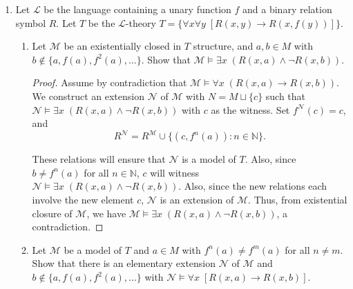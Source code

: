 \documentclass{article}
\begin{document}
\begin{enumerate}[label={\bf Q\arabic*:}]
  \item Let $\mathcal{L}$ be the language containing a unary function $f$
    and a binary relation symbol $R$. Let $T$ be the $\mathcal{L}$-theory
    $T=\{\forall x\forall y\; [R(x,y)\rightarrow R(x,f(y))]\}$.

    \begin{enumerate}
      \item Let $\mathcal{M}$ be an existentially closed in $T$ structure,
        and $a,b\in M$ with $b\not\in\{a,f(a),f^2(a),\ldots\}$. Show that
        $\mathcal{M}\models \exists x\; (R(x,a)\wedge\neg R(x,b))$.

        \begin{proof}
          Assume by contradiction that $\mathcal{M}\models \forall x\;
          (R(x,a)\rightarrow R(x,b))$. We construct an extension
          $\mathcal{N}$ of $\mathcal{M}$ with $N=M\sqcup\{c\}$
          such that $\mathcal{N}\models \exists x\; (R(x,a)\wedge\neg
          R(x,b))$ with $c$ as the witness. Set $f^\mathcal{N}(c)=c$, and
          \[R^\mathcal{N}= R^\mathcal{M} \cup
          \{(c,f^n(a)):n\in\mathbb{N}\}.\]

          These relations will ensure that $\mathcal{N}$ is a model of $T$.
          Also, since $b\neq f^n(a)$ for all $n\in\mathbb{N}$, $c$ will
          witness $\mathcal{N}\models \exists x\; (R(x,a)\wedge\neg
          R(x,b))$. Also, since the new relations each involve the new
          element $c$, $\mathcal{N}$ is an extension of $\mathcal{M}$.
          Thus, from existential closure of $\mathcal{M}$, we have
          $\mathcal{M}\models \exists x\; (R(x,a)\wedge\neg R(x,b))$, a
          contradiction.
        \end{proof}

      \item Let $\mathcal{M}$ be a model of $T$ and $a\in M$ with
        $f^n(a)\neq f^m(a)$ for all $n\neq m$. Show that there is an
        elementary extension $\mathcal{N}$ of $\mathcal{M}$ and
        $b\not\in\{a,f(a),f^2(a),\ldots\}$ with $\mathcal{N}\models\forall
        x\; [R(x,a)\rightarrow R(x,b)]$.


\end{enumerate}
\end{enumerate}
\end{document}
